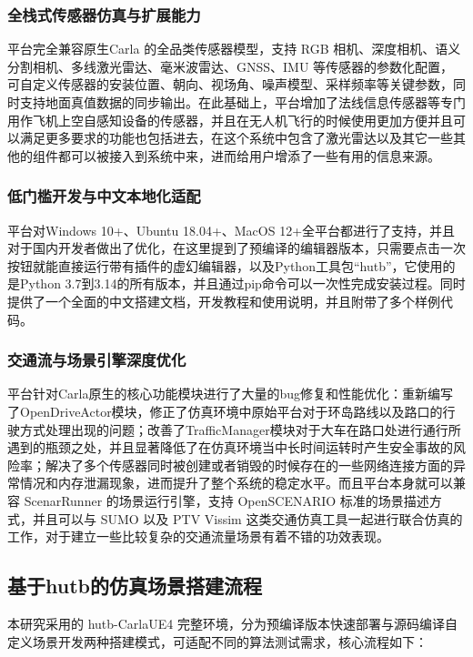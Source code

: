 \subsubsection{全栈式传感器仿真与扩展能力}

平台完全兼容原生Carla 的全品类传感器模型，支持 RGB 相机、深度相机、语义分割相机、多线激光雷达、毫米波雷达、GNSS、IMU 等传感器的参数化配置，可自定义传感器的安装位置、朝向、视场角、噪声模型、采样频率等关键参数，同时支持地面真值数据的同步输出。在此基础上，平台增加了法线信息传感器等专门用作飞机上空自感知设备的传感器，并且在无人机飞行的时候使用更加方便并且可以满足更多要求的功能也包括进去，在这个系统中包含了激光雷达以及其它一些其他的组件都可以被接入到系统中来，进而给用户增添了一些有用的信息来源。

\subsubsection{低门槛开发与中文本地化适配}

平台对Windows 10+、Ubuntu 18.04+、MacOS 12+全平台都进行了支持，并且对于国内开发者做出了优化，在这里提到了预编译的编辑器版本，只需要点击一次按钮就能直接运行带有插件的虚幻编辑器，以及Python工具包“hutb”，它使用的是Python 3.7到3.14的所有版本，并且通过pip命令可以一次性完成安装过程。同时提供了一个全面的中文搭建文档，开发教程和使用说明，并且附带了多个样例代码。

\subsubsection{交通流与场景引擎深度优化}

平台针对Carla原生的核心功能模块进行了大量的bug修复和性能优化：重新编写了OpenDriveActor模块，修正了仿真环境中原始平台对于环岛路线以及路口的行驶方式处理出现的问题；改善了TrafficManager模块对于大车在路口处进行通行所遇到的瓶颈之处，并且显著降低了在仿真环境当中长时间运转时产生安全事故的风险率；解决了多个传感器同时被创建或者销毁的时候存在的一些网络连接方面的异常情况和内存泄漏现象，进而提升了整个系统的稳定水平。而且平台本身就可以兼容 ScenarRunner 的场景运行引擎，支持 OpenSCENARIO 标准的场景描述方式，并且可以与 SUMO 以及 PTV Vissim 这类交通仿真工具一起进行联合仿真的工作，对于建立一些比较复杂的交通流量场景有着不错的功效表现。

\subsection{基于hutb的仿真场景搭建流程}

本研究采用的 hutb-CarlaUE4 完整环境，分为预编译版本快速部署与源码编译自定义场景开发两种搭建模式，可适配不同的算法测试需求，核心流程如下：

